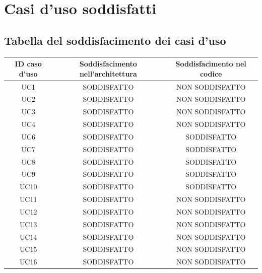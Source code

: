 \section{Casi d'uso soddisfatti}
\subsection{Tabella del soddisfacimento dei casi d'uso}
\begin{table}[hp]
\centering
\begin{tabular}{|c|c|c|}
\hline
ID caso d'uso & Soddisfacimento nell'architettura & Soddisfacimento nel codice \\ \hline
UC1         & SODDISFATTO                       & NON SODDISFATTO                \\ \hline
UC2         & SODDISFATTO                       & NON SODDISFATTO                \\ \hline
UC3         & SODDISFATTO                       & NON SODDISFATTO                \\ \hline
UC4         & SODDISFATTO                       & NON SODDISFATTO                \\ \hline
UC6         & SODDISFATTO                       & SODDISFATTO                \\ \hline
UC7         & SODDISFATTO                       & SODDISFATTO                \\ \hline
UC8         & SODDISFATTO                       & SODDISFATTO                \\ \hline
UC9         & SODDISFATTO                       & SODDISFATTO                \\ \hline
UC10         & SODDISFATTO                       & SODDISFATTO                \\ \hline
UC11         & SODDISFATTO                       & NON SODDISFATTO                \\ \hline
UC12         & SODDISFATTO                       & NON SODDISFATTO                \\ \hline
UC13         & SODDISFATTO                       & NON SODDISFATTO                \\ \hline
UC14         & SODDISFATTO                       & NON SODDISFATTO                \\ \hline
UC15         & SODDISFATTO                       & NON SODDISFATTO                \\ \hline
UC16         & SODDISFATTO                       & NON SODDISFATTO                \\ \hline

\end{tabular}
\end{table}
